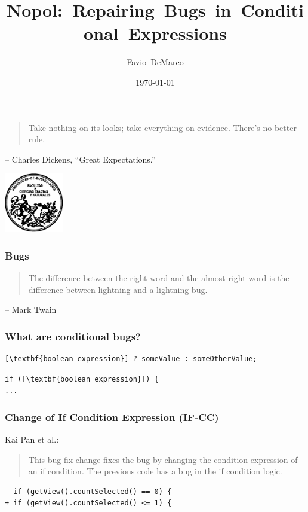 \documentclass[onlymath]{beamer}
\title[{Nopol: Repairing Bugs in Conditional Expressions}]{Nopol:~Repairing~Bugs~in~Conditional~Expressions}
\author[Favio DeMarco]{Favio~DeMarco}
\institute[U.B.A. - INRIA]{Universidad de Buenos Aires - INRIA}
\date{\today}
\begin{document}
  \frame
  {
\begin{quote}
    Take nothing on its looks; take everything on evidence. There's no better rule.
\end{quote}    
– Charles Dickens, ``Great Expectations.''
  }

\frame
  {
  \begin{center}
  \includegraphics[width=7em]{logofcen}
  \end{center}
    \titlepage
  }

\begin{frame}  
\frametitle{Bugs}
\begin{quotation}
The difference between the right word and the almost right word is the difference between lightning and a lightning bug.
\end{quotation}
-- Mark Twain
\end{frame}
 
  
\begin{frame}[fragile]
\frametitle{What are conditional bugs?}
\begin{lstlisting}[escapeinside=\[\]]
[\textbf{boolean expression}] ? someValue : someOtherValue;
\end{lstlisting}

\begin{lstlisting}[escapeinside=\[\]]
if ([\textbf{boolean expression}]) {
...
\end{lstlisting}
\end{frame}

\begin{frame}[fragile]
\frametitle{Change of If Condition Expression (IF-CC)}
Kai Pan et al.:
\begin{quotation}
This bug fix change fixes the bug by changing the condition expression of an if
condition. The previous code has a bug in the if condition logic.
\end{quotation}

\vspace{1em}

\begin{lstlisting}
- if (getView().countSelected() == 0) {
+ if (getView().countSelected() <= 1) {
\end{lstlisting}
\end{frame}
  
\end{document}
